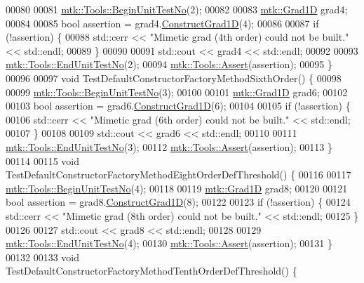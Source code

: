 \begin{DoxyCode}
00080 
00081   \hyperlink{classmtk_1_1Tools_a26ee906d28523378522a75e25c3a4e19}{mtk::Tools::BeginUnitTestNo}(2);
00082 
00083   \hyperlink{classmtk_1_1Grad1D}{mtk::Grad1D} grad4;
00084 
00085   \textcolor{keywordtype}{bool} assertion = grad4.\hyperlink{classmtk_1_1Grad1D_a74ef5245cfae6fd158bd7f563a0c2e52}{ConstructGrad1D}(4);
00086 
00087   \textcolor{keywordflow}{if} (!assertion) \{
00088     std::cerr << \textcolor{stringliteral}{"Mimetic grad (4th order) could not be built."} << std::endl;
00089   \}
00090 
00091   std::cout << grad4 << std::endl;
00092 
00093   \hyperlink{classmtk_1_1Tools_ad8cf0085133dd40c913fe195bc5b9694}{mtk::Tools::EndUnitTestNo}(2);
00094   \hyperlink{classmtk_1_1Tools_aa311fada9255627d06c56b1e4fedce9e}{mtk::Tools::Assert}(assertion);
00095 \}
00096 
00097 \textcolor{keywordtype}{void} TestDefaultConstructorFactoryMethodSixthOrder() \{
00098 
00099   \hyperlink{classmtk_1_1Tools_a26ee906d28523378522a75e25c3a4e19}{mtk::Tools::BeginUnitTestNo}(3);
00100 
00101   \hyperlink{classmtk_1_1Grad1D}{mtk::Grad1D} grad6;
00102 
00103   \textcolor{keywordtype}{bool} assertion = grad6.\hyperlink{classmtk_1_1Grad1D_a74ef5245cfae6fd158bd7f563a0c2e52}{ConstructGrad1D}(6);
00104 
00105   \textcolor{keywordflow}{if} (!assertion) \{
00106     std::cerr << \textcolor{stringliteral}{"Mimetic grad (6th order) could not be built."} << std::endl;
00107   \}
00108 
00109   std::cout << grad6 << std::endl;
00110 
00111   \hyperlink{classmtk_1_1Tools_ad8cf0085133dd40c913fe195bc5b9694}{mtk::Tools::EndUnitTestNo}(3);
00112   \hyperlink{classmtk_1_1Tools_aa311fada9255627d06c56b1e4fedce9e}{mtk::Tools::Assert}(assertion);
00113 \}
00114 
00115 \textcolor{keywordtype}{void} TestDefaultConstructorFactoryMethodEightOrderDefThreshold() \{
00116 
00117   \hyperlink{classmtk_1_1Tools_a26ee906d28523378522a75e25c3a4e19}{mtk::Tools::BeginUnitTestNo}(4);
00118 
00119   \hyperlink{classmtk_1_1Grad1D}{mtk::Grad1D} grad8;
00120 
00121   \textcolor{keywordtype}{bool} assertion = grad8.\hyperlink{classmtk_1_1Grad1D_a74ef5245cfae6fd158bd7f563a0c2e52}{ConstructGrad1D}(8);
00122 
00123   \textcolor{keywordflow}{if} (!assertion) \{
00124     std::cerr << \textcolor{stringliteral}{"Mimetic grad (8th order) could not be built."} << std::endl;
00125   \}
00126 
00127   std::cout << grad8 << std::endl;
00128 
00129   \hyperlink{classmtk_1_1Tools_ad8cf0085133dd40c913fe195bc5b9694}{mtk::Tools::EndUnitTestNo}(4);
00130   \hyperlink{classmtk_1_1Tools_aa311fada9255627d06c56b1e4fedce9e}{mtk::Tools::Assert}(assertion);
00131 \}
00132 
00133 \textcolor{keywordtype}{void} TestDefaultConstructorFactoryMethodTenthOrderDefThreshold() \{

\end{DoxyCode}
